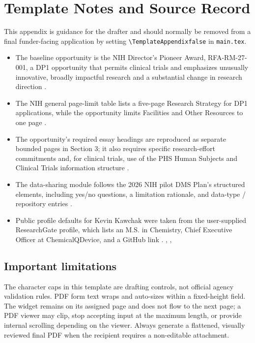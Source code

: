 \section*{Template Notes and Source Record}

This appendix is guidance for the drafter and should normally be removed from a final funder-facing application by setting \verb|\TemplateAppendixfalse| in \verb|main.tex|.

\begin{itemize}
  \item The baseline opportunity is the NIH Director's Pioneer Award, RFA-RM-27-001, a DP1 opportunity that permits clinical trials and emphasizes unusually innovative, broadly impactful research and a substantial change in research direction \citep{nih_rfa_rm_27_001}.
  \item The NIH general page-limit table lists a five-page Research Strategy for DP1 applications, while the opportunity limits Facilities and Other Resources to one page \citep{nih_page_limits,nih_rfa_rm_27_001}.
  \item The opportunity's required essay headings are reproduced as separate bounded pages in Section 3; it also requires specific research-effort commitments and, for clinical trials, use of the PHS Human Subjects and Clinical Trials information structure \citep{nih_rfa_rm_27_001}.
  \item The data-sharing module follows the 2026 NIH pilot DMS Plan's structured elements, including yes/no questions, a limitation rationale, and data-type / repository entries \citep{nih_dms_2026}.
  \item Public profile defaults for Kevin Kawchak were taken from the user-supplied ResearchGate profile, which lists an M.S. in Chemistry, Chief Executive Officer at ChemicalQDevice, and a GitHub link \citep{kawchak_researchgate}. \citep{phase1ind}, \citep{qspmetpancre}, \citep{chatgpt100kp}
\end{itemize}

\subsection*{Important limitations}
The character caps in this template are drafting controls, not official agency validation rules. PDF form text wraps and auto-sizes within a fixed-height field. The widget remains on its assigned page and does not flow to the next page; a PDF viewer may clip, stop accepting input at the maximum length, or provide internal scrolling depending on the viewer. Always generate a flattened, visually reviewed final PDF when the recipient requires a non-editable attachment.
